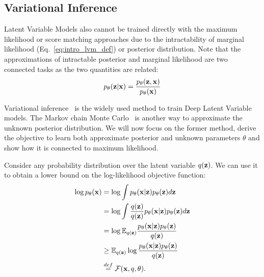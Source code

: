 \subsection{Variational Inference}\label{sec:intro_vi}
Latent Variable Models also cannot be trained directly with the maximum likelihood or score matching approaches due to the intractability of marginal likelihood (Eq.~\ref{eq:intro_lvm_def}) or posterior distribution. 
Note that the approximations of intractable posterior and marginal likelihood are two connected tasks as the two quantities are related:
\begin{equation}
    p_{\theta}({\mathbf{z}}|{\mathbf{x}}) = \frac{p_{\theta}({\mathbf{z}}, {\mathbf{x}})}{p_{\theta}({\mathbf{x}})}
\end{equation}

Variational inference~\citep{jordan1999introduction} is the widely used method to train Deep Latent Variable models. 
The Markov chain Monte Carlo~\citep{neal1993probabilistic} is another way to approximate the unknown posterior distribution. 
We will now focus on the former method, derive the objective to learn both approximate posterior and unknown parameters $\theta$ and show how it is connected to maximum likelihood. 


Consider any probability distribution over the latent variable $q({\mathbf{z}})$. We can use it to obtain a lower bound on the log-likelihood objective function:
\begin{align}
    \log p_{\theta}(\rvx) &=  \log \int p_{\theta}(\rvx|\rvz)p_{\theta}(\rvz)d\rvz \label{eq:intro_elbo_def_1}\\
   &=  \log \int \frac{q(\rvz)}{q(\rvz)} p_{\theta}(\rvx|\rvz)p_{\theta}(\rvz)d\rvz \label{eq:intro_elbo_def_2}\\
   &=  \log \E_{q(\rvz)} \frac{p_{\theta}(\rvx|\rvz)p_{\theta}(\rvz)}{q(\rvz)} \label{eq:intro_elbo_def_3}\\
   &\geq  \E_{q(\rvz)}\log  \frac{p_{\theta}(\rvx|\rvz)p_{\theta}(\rvz)}{q(\rvz)} \label{eq:intro_elbo_def_4}\\
   &\overset{def}{=} \mathcal{F}(\rvx, q, \theta). \notag
\end{align}

